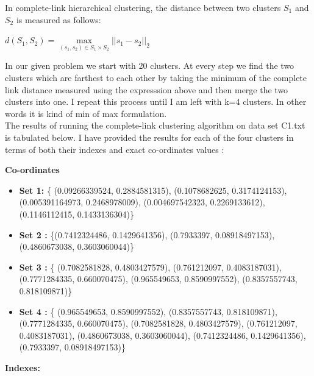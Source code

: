 \documentclass[11pt]{article}
\begin{document}
\begin{itemize}
	In complete-link hierarchical clustering, the distance between two clusters $S_1$ and $S_2$ is measured as follows:
	\begin{center}
		$d(S_1,S_2)= \underset{(s_1,s_2) \in S_1 \times S_2}{\max} || s_1 -s_2||_2$
	\end{center}
	
	In our given problem we start with 20 clusters. At every step we find the two clusters which are farthest to each other by taking the minimum of the complete link distance measured using the expresssion above and then merge the two clusters into one. I repeat this process until I am left with k=4 clusters. In other words it is kind of min of max formulation.\\
	
	The results of running the complete-link clustering algorithm on data set C1.txt is tabulated below. I have provided the results for each of the four clusters in terms of both their indexes and exact co-ordinates values :
	
	\textbf{ Co-ordinates}
	
	\begin{itemize}
		\item[]	\textbf{Set 1:}  \{ (0.09266339524, 0.2884581315), (0.1078682625, 0.3174124153), (0.005391164973, 0.2468978009), (0.004697542323, 0.2269133612), (0.1146112415, 0.1433136304)\}\\
		
		\item[] \textbf{Set 2 :}  \{(0.7412324486, 0.1429641356), (0.7933397, 0.08918497153), (0.4860673038, 0.3603060044)\}   \\
		
		\item[] \textbf{Set 3 :}  \{ (0.7082581828, 0.4803427579), (0.761212097, 0.4083187031), (0.7771284335, 0.660070475), (0.965549653, 0.8590997552), (0.8357557743, 0.818109871)\}
		
		\item[] \textbf{Set 4 :}  \{ (0.965549653, 0.8590997552), (0.8357557743, 0.818109871), (0.7771284335, 0.660070475), (0.7082581828, 0.4803427579), (0.761212097, 0.4083187031), (0.4860673038, 0.3603060044), (0.7412324486, 0.1429641356), (0.7933397, 0.08918497153)\}
		
	\end{itemize}
	
	\textbf{Indexes:}
		

\end{itemize}
\end{document}
